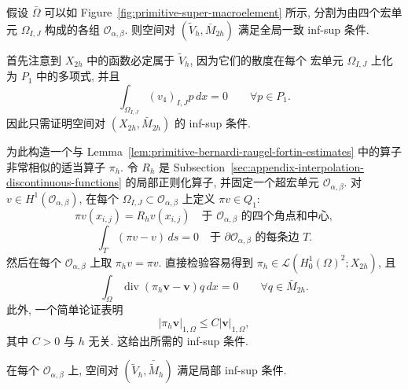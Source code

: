 \setcounter{statement}{7}
\renewcommand{\theHstatement}{lemma.\thesection.\arabic{statement}}
\begin{Lemma}\label{lem:primitive-q1-p0-supermacro-global-inf-sup}
假设 $\bar\Omega$ 可以如 Figure~\ref{fig:primitive-super-macroelement}
所示, 分割为由四个宏单元 $\Omega_{I,J}$ 构成的各组
$\mathcal O_{\alpha,\beta}$. 则空间对
$(\widetilde V_h,\bar M_{2h})$ 满足全局一致 inf-sup 条件.
\end{Lemma}

\begin{Proof}
首先注意到 $X_{2h}$ 中的函数必定属于 $\widetilde V_h$, 因为它们的散度在每个
宏单元 $\Omega_{I,J}$ 上化为 $P_1$ 中的多项式, 并且
\[
\int_{\Omega_{I,J}}(v_4)_{I,J}p\,dx=0
\qquad\forall p\in P_1.
\]
因此只需证明空间对 $(X_{2h},\bar M_{2h})$ 的 inf-sup 条件.

为此构造一个与 Lemma~\ref{lem:primitive-bernardi-raugel-fortin-estimates}
中的算子非常相似的适当算子 $\pi_h$. 令 $R_h$ 是
Subsection~\ref{sec:appendix-interpolation-discontinuous-functions}
的局部正则化算子, 并固定一个超宏单元 $\mathcal O_{\alpha,\beta}$.
对 $v\in H^1(\mathcal O_{\alpha,\beta})$, 在每个
$\Omega_{I,J}\subset\mathcal O_{\alpha,\beta}$ 上定义 $\pi v\in Q_1$:
\[
\pi v(x_{i,j})=R_hv(x_{i,j})
\quad\text{于 $\mathcal O_{\alpha,\beta}$ 的四个角点和中心},
\]
\[
\int_T(\pi v-v)\,ds=0
\quad\text{于 $\partial\mathcal O_{\alpha,\beta}$ 的每条边 $T$}.
\]
然后在每个 $\mathcal O_{\alpha,\beta}$ 上取 $\pi_hv=\pi v$.
直接检验容易得到
$\pi_h\in\mathcal L(H_0^1(\Omega)^2;X_{2h})$, 且
\[
\int_\Omega\operatorname{div}(\pi_h\mathbf v-\mathbf v)q\,dx=0
\qquad\forall q\in\bar M_{2h}.
\]
此外, 一个简单论证表明
\[
|\pi_h\mathbf v|_{1,\Omega}\leq C|\mathbf v|_{1,\Omega},
\]
其中 $C>0$ 与 $h$ 无关. 这给出所需的 inf-sup 条件.
\end{Proof}

\setcounter{statement}{8}
\renewcommand{\theHstatement}{lemma.\thesection.\arabic{statement}}
\begin{Lemma}\label{lem:primitive-q1-p0-supermacro-local-inf-sup}
在每个 $\mathcal O_{\alpha,\beta}$ 上, 空间对
$(\widetilde V_h,\bar{\widetilde M}_h)$ 满足局部 inf-sup 条件.
\end{Lemma}

